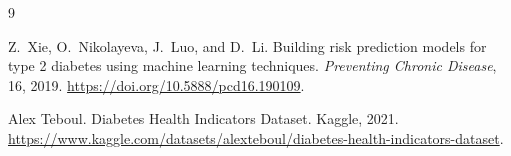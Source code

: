 \documentclass{article}
\begin{document}
\begin{thebibliography}{9}
 
Z.~Xie, O.~Nikolayeva, J.~Luo, and D.~Li.
\newblock Building risk prediction models for type 2 diabetes using machine learning techniques.
\newblock \textit{Preventing Chronic Disease}, 16, 2019.
\newblock \url{https://doi.org/10.5888/pcd16.190109}.
 
Alex Teboul.
\newblock Diabetes Health Indicators Dataset.
\newblock Kaggle, 2021.
\newblock \url{https://www.kaggle.com/datasets/alexteboul/diabetes-health-indicators-dataset}.
 
\end{thebibliography}
\end{document}
